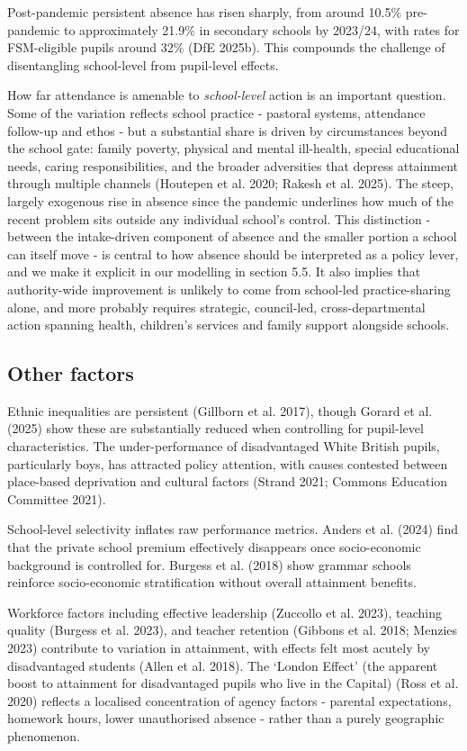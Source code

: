 \documentclass[
  12pt,
  titlepage]{article}
\begin{document}
Post-pandemic persistent absence has risen sharply, from around 10.5\%
pre-pandemic to approximately 21.9\% in secondary schools by 2023/24,
with rates for FSM-eligible pupils around 32\% (DfE 2025b). This
compounds the challenge of disentangling school-level from pupil-level
effects.

How far attendance is amenable to \emph{school-level} action is an
important question. Some of the variation reflects school practice -
pastoral systems, attendance follow-up and ethos - but a substantial
share is driven by circumstances beyond the school gate: family poverty,
physical and mental ill-health, special educational needs, caring
responsibilities, and the broader adversities that depress attainment
through multiple channels (Houtepen et al. 2020; Rakesh et al. 2025).
The steep, largely exogenous rise in absence since the pandemic
underlines how much of the recent problem sits outside any individual
school's control. This distinction - between the intake-driven component
of absence and the smaller portion a school can itself move - is central
to how absence should be interpreted as a policy lever, and we make it
explicit in our modelling in section 5.5. It also implies that
authority-wide improvement is unlikely to come from school-led
practice-sharing alone, and more probably requires strategic,
council-led, cross-departmental action spanning health, children's
services and family support alongside schools.

\subsection{Other factors}\label{other-factors}

Ethnic inequalities are persistent (Gillborn et al. 2017), though Gorard
et al. (2025) show these are substantially reduced when controlling for
pupil-level characteristics. The under-performance of disadvantaged
White British pupils, particularly boys, has attracted policy attention,
with causes contested between place-based deprivation and cultural
factors (Strand 2021; Commons Education Committee 2021).

School-level selectivity inflates raw performance metrics. Anders et al.
(2024) find that the private school premium effectively disappears once
socio-economic background is controlled for. Burgess et al. (2018) show
grammar schools reinforce socio-economic stratification without overall
attainment benefits.

Workforce factors including effective leadership (Zuccollo et al. 2023),
teaching quality (Burgess et al. 2023), and teacher retention (Gibbons
et al. 2018; Menzies 2023) contribute to variation in attainment, with
effects felt most acutely by disadvantaged students (Allen et al. 2018).
The `London Effect' (the apparent boost to attainment for disadvantaged
pupils who live in the Capital) (Ross et al. 2020) reflects a localised
concentration of agency factors - parental expectations, homework hours,
lower unauthorised absence - rather than a purely geographic phenomenon.
\end{document}
